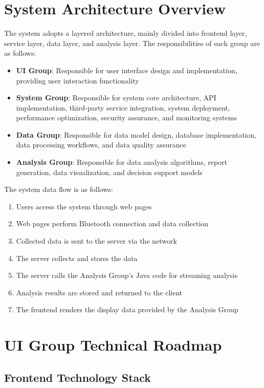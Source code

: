 \documentclass[a4paper,12pt]{article}
\begin{document}
\section{System Architecture Overview}

The system adopts a layered architecture, mainly divided into frontend layer, service layer, data layer, and analysis layer. The responsibilities of each group are as follows:

\begin{itemize}
  \item \textbf{UI Group}: Responsible for user interface design and implementation, providing user interaction functionality
  \item \textbf{System Group}: Responsible for system core architecture, API implementation, third-party service integration, system deployment, performance optimization, security assurance, and monitoring systems
  \item \textbf{Data Group}: Responsible for data model design, database implementation, data processing workflows, and data quality assurance
  \item \textbf{Analysis Group}: Responsible for data analysis algorithms, report generation, data visualization, and decision support models
\end{itemize}

The system data flow is as follows:
\begin{enumerate}
  \item Users access the system through web pages
  \item Web pages perform Bluetooth connection and data collection
  \item Collected data is sent to the server via the network
  \item The server collects and stores the data
  \item The server calls the Analysis Group's Java code for streaming analysis
  \item Analysis results are stored and returned to the client
  \item The frontend renders the display data provided by the Analysis Group
\end{enumerate}

\section{UI Group Technical Roadmap}

\subsection{Frontend Technology Stack}
\end{document}

